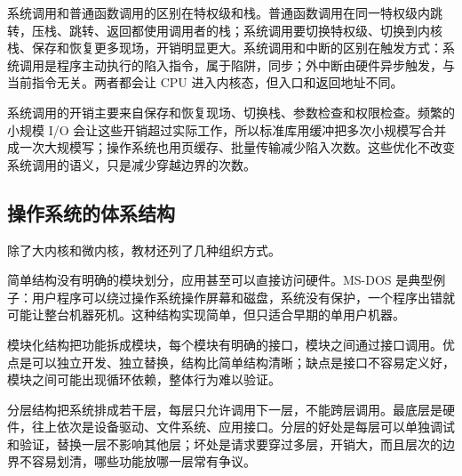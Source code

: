 系统调用和普通函数调用的区别在特权级和栈。普通函数调用在同一特权级内跳转，压栈、跳转、返回都使用调用者的栈；系统调用要切换特权级、切换到内核栈、保存和恢复更多现场，开销明显更大。系统调用和中断的区别在触发方式：系统调用是程序主动执行的陷入指令，属于陷阱，同步；外中断由硬件异步触发，与当前指令无关。两者都会让 CPU 进入内核态，但入口和返回地址不同。

系统调用的开销主要来自保存和恢复现场、切换栈、参数检查和权限检查。频繁的小规模 I/O 会让这些开销超过实际工作，所以标准库用缓冲把多次小规模写合并成一次大规模写；操作系统也用页缓存、批量传输减少陷入次数。这些优化不改变系统调用的语义，只是减少穿越边界的次数。

\subsection{操作系统的体系结构}

除了大内核和微内核，教材还列了几种组织方式。

简单结构没有明确的模块划分，应用甚至可以直接访问硬件。MS-DOS 是典型例子：用户程序可以绕过操作系统操作屏幕和磁盘，系统没有保护，一个程序出错就可能让整台机器死机。这种结构实现简单，但只适合早期的单用户机器。

模块化结构把功能拆成模块，每个模块有明确的接口，模块之间通过接口调用。优点是可以独立开发、独立替换，结构比简单结构清晰；缺点是接口不容易定义好，模块之间可能出现循环依赖，整体行为难以验证。

分层结构把系统排成若干层，每层只允许调用下一层，不能跨层调用。最底层是硬件，往上依次是设备驱动、文件系统、应用接口。分层的好处是每层可以单独调试和验证，替换一层不影响其他层；坏处是请求要穿过多层，开销大，而且层次的边界不容易划清，哪些功能放哪一层常有争议。

